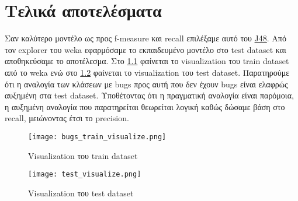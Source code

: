\chapter{Τελικά αποτελέσματα}

Σαν καλύτερο μοντέλο ως προς f-measure και recall επιλέξαμε αυτό του \hyperref[sssec:j48]{J48}.
Από τον explorer του weka εφαρμόσαμε το εκπαιδευμένο μοντέλο στο test dataset και αποθηκεύσαμε το αποτέλεσμα.
Στο \hyperref[fig:train-set-visualize]{\figurename{} \ref{fig:train-set-visualize}}
φαίνεται το visualization του train dataset από το weka 
ενώ στο \hyperref[fig:test-set-visualize]{\figurename{} \ref{fig:test-set-visualize}}
φαίνεται το visualization του test dataset.
Παρατηρούμε ότι η αναλογία των κλάσεων με bugs προς αυτή που δεν έχουν bugs είναι ελαφρώς αυξημένη στα 
test dataset.
Υποθέτοντας ότι η πραγματική αναλογία είναι παρόμοια, η αυξημένη αναλογία που παρατηρείται θεωρείται λογική καθώς δώσαμε βάση στο recall,
μειώνοντας έτσι το precision.

\begin{figure}[htb]
\centering
\texttt{[image: bugs\_train\_visualize.png]}
\caption{Visualization του train dataset}
\label{fig:train-set-visualize}
\end{figure}
\begin{figure}[htb]
\centering
\texttt{[image: test\_visualize.png]}
\caption{Visualization του test dataset}
\label{fig:test-set-visualize}
\end{figure}